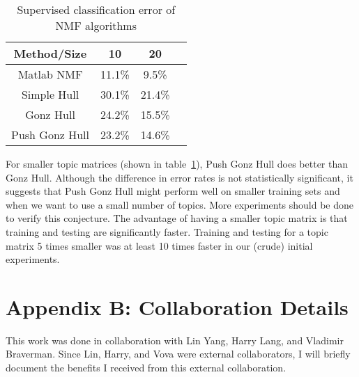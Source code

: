 \documentclass[12pt]{report}
\theoremstyle{definition}
\theoremstyle{lemma}
\theoremstyle{theorem}
\theoremstyle{corollary}
\begin{document}
\begin{table}[h!]
\centering
\begin{tabular}{ |c|c|c|c| } 
 \hline
   Method/Size & 10 & 20 \\ 
 \hline
 Matlab NMF & 11.1\% & 9.5\% \\ 
 \hline
 Simple Hull & 30.1\% & 21.4\% \\ 
 \hline
  Gonz Hull & 24.2\% & 15.5\% \\ 
 \hline
  Push Gonz Hull & 23.2\% & 14.6\% \\ 
 \hline
\end{tabular}
\caption{Supervised classification error of NMF algorithms}
\label{tab:smaller_results}
\end{table}

For smaller topic matrices (shown in table~\ref{tab:smaller_results}), Push Gonz Hull does better than Gonz Hull. Although the difference in error rates is not statistically significant, it suggests that Push Gonz Hull might perform well on smaller training sets and when we want to use a small number of topics. More experiments should be done to verify this conjecture. The advantage of having a smaller topic matrix is that training and testing are significantly faster. Training and testing for a topic matrix 5 times smaller was at least 10 times faster in our (crude) initial experiments.

\chapter*{Appendix B: Collaboration Details}

This work was done in collaboration with Lin Yang, Harry Lang, and Vladimir Braverman. Since Lin, Harry, and Vova were external collaborators, I will briefly document the benefits I received from this external collaboration. 
\end{document}
